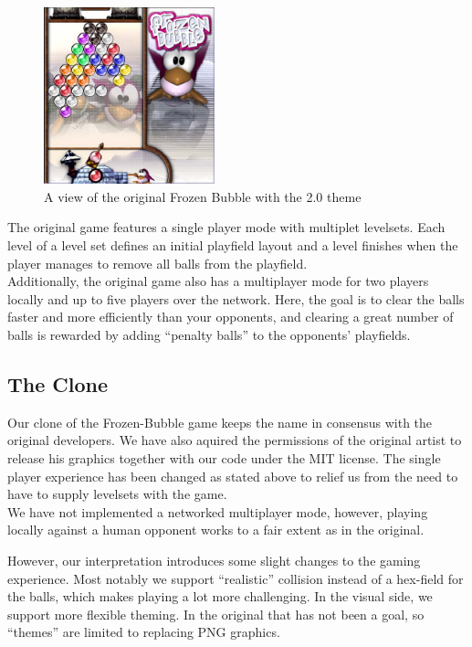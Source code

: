 \begin{figure}
\vspace{-2em}
  \begin{center}
    \includegraphics[width=0.44\textwidth]{images/screenshot1}
  \end{center}
  \vspace{-1em}
  \caption{A view of the original Frozen Bubble with the 2.0 theme}
\vspace{-2em}
\end{figure}

The original game features a single player mode with multiplet levelsets. Each level 
of a level set defines an initial playfield layout and
a level finishes when the player manages to remove all balls 
from the playfield.\\
Additionally, the original game also has a multiplayer mode for two players 
locally and up to five players over the network. Here, the goal is to clear the balls 
faster and more efficiently than your opponents, and clearing a great number of balls 
is rewarded by adding ``penalty balls'' to the opponents' playfields.
%
\subsection{The Clone}
Our clone of the Frozen-Bubble game keeps the name in consensus with the original developers.
We have also aquired the permissions of the original artist to release his graphics 
together with our code under the MIT license.
The single player experience has been changed as stated above to relief us from the need 
to have to supply levelsets with the game.\\
We have not implemented a networked multiplayer mode, however, playing locally against 
a human opponent works to a fair extent as in the original.

However, our interpretation introduces some slight changes to the gaming experience.
Most notably we support ``realistic'' collision instead of a hex-field for the balls, which
makes playing a lot more challenging. In the visual side, we support more flexible theming.
In the original that has not been a goal, so ``themes'' are limited to replacing 
PNG graphics.
%
